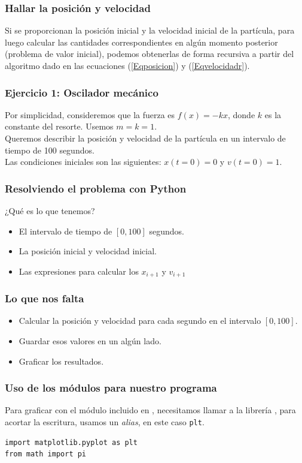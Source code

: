 \begin{frame}
\frametitle{Hallar la posición y velocidad}
Si se proporcionan la posición inicial y la velocidad inicial de la partícula, para luego calcular las cantidades correspondientes en algún momento posterior (problema de valor inicial), podemos obtenerlas de forma recursiva a partir del algoritmo dado en las ecuaciones (\ref{Eqposicion}) y (\ref{Eqvelocidadr}).
\end{frame}
\begin{frame}
\frametitle{Ejercicio 1: Oscilador mecánico}
Por simplicidad, consideremos que la fuerza es $f(x) = -kx$, donde $k$ es la constante del resorte. Usemos $m=k=1$.
\\
\bigskip
\pause
Queremos describir la posición y velocidad de la partícula en un intervalo de tiempo de 100 segundos.
\\
\bigskip
\pause
Las condiciones iniciales son las siguientes: $x(t=0) = 0$ y $v(t=0) = 1$.
\end{frame}
\begin{frame}[<+->]
\frametitle{Resolviendo el problema con Python}
¿Qué es lo que tenemos?
\begin{itemize}
\item El intervalo de tiempo de $[0,100]$ segundos.
\item La posición inicial y velocidad inicial.
\item Las expresiones para calcular los $x_{i+1}$ y $v_{i+1}$
\end{itemize}
\end{frame}
\begin{frame}[fragile]
\frametitle{Lo que nos falta}
\begin{itemize}[<+->]
\item Calcular la posición y velocidad para cada segundo en el intervalo $[0,100]$.
\item Guardar esos valores en un algún lado.
\item Graficar los resultados.
\end{itemize}
\end{frame}
\begin{frame}[fragile]
\frametitle{Uso de los módulos para nuestro programa}
Para graficar con el módulo  incluido en \python, necesitamos llamar a la librería , para acortar la escritura, usamos un \emph{alias}, en este caso \texttt{plt}.
\begin{lstlisting}[caption=Importando librerías, basicstyle=\linespread{1.2}\ttfamily\small, columns=fullflexible]
import matplotlib.pyplot as plt
from math import pi
\end{lstlisting}
\end{frame}
